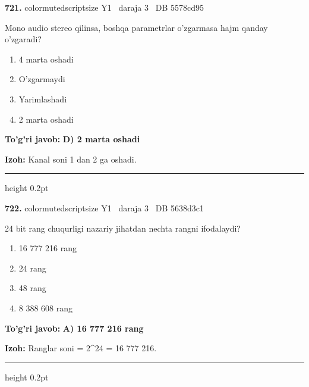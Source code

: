 \documentclass[10pt,a4paper,oneside]{article}
\begin{document}
\noindent\textbf{\color{ink}721.}  {color{muted}scriptsize Y1 \textbullet\ daraja 3 \textbullet\ DB 5578cd95}
\par
Mono audio stereo qilinsa, boshqa parametrlar o'zgarmasa hajm qanday o'zgaradi?
\begin{enumerate}[label=\Alph*),leftmargin=9mm]
\item 4 marta oshadi
\item O'zgarmaydi
\item Yarimlashadi
\item 2 marta oshadi
\end{enumerate}
\begin{tcolorbox}[enhanced,breakable,colback=teal!4,colframe=teal!50!black,boxrule=0.5pt,arc=1.1mm,left=3mm,right=3mm,top=1.7mm,bottom=1.7mm,before skip=2mm,after skip=2mm]
\textbf{\color{teal}To'g'ri javob:} \textbf{D) 2 marta oshadi}
\par\smallskip
\textbf{Izoh:} Kanal soni 1 dan 2 ga oshadi.
\end{tcolorbox}
\vspace{2mm}\hrule height 0.2pt \vspace{3mm}

\noindent\textbf{\color{ink}722.}  {color{muted}scriptsize Y1 \textbullet\ daraja 3 \textbullet\ DB 5638d3c1}
\par
24 bit rang chuqurligi nazariy jihatdan nechta rangni ifodalaydi?
\begin{enumerate}[label=\Alph*),leftmargin=9mm]
\item 16 777 216 rang
\item 24 rang
\item 48 rang
\item 8 388 608 rang
\end{enumerate}
\begin{tcolorbox}[enhanced,breakable,colback=teal!4,colframe=teal!50!black,boxrule=0.5pt,arc=1.1mm,left=3mm,right=3mm,top=1.7mm,bottom=1.7mm,before skip=2mm,after skip=2mm]
\textbf{\color{teal}To'g'ri javob:} \textbf{A) 16 777 216 rang}
\par\smallskip
\textbf{Izoh:} Ranglar soni = 2\textasciicircum{}24 = 16 777 216.
\end{tcolorbox}
\vspace{2mm}\hrule height 0.2pt \vspace{3mm}
\end{document}
